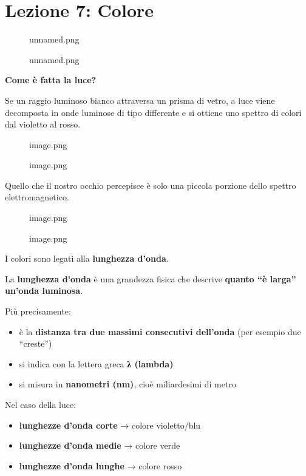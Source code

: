 \documentclass[
]{article}
\author{}
\date{}
\providecommand{\tightlist}{%
  \setlength{\itemsep}{0pt}\setlength{\parskip}{0pt}}
\begin{document}
\hypertarget{lezione-7-colore}{%
\section{Lezione 7: Colore}\label{lezione-7-colore}}

\begin{figure}
\centering
{unnamed.png}
\caption{unnamed.png}
\end{figure}

\textbf{Come è fatta la luce?}

Se un raggio luminoso bianco attraversa un prisma di vetro, a luce viene decomposta in onde luminose di tipo differente e si ottiene uno spettro di colori dal violetto al rosso.

\begin{figure}
\centering
{image.png}
\caption{image.png}
\end{figure}

Quello che il nostro occhio percepisce è solo una piccola porzione dello spettro elettromagnetico.

\begin{figure}
\centering
{image.png}
\caption{image.png}
\end{figure}

I colori sono legati alla \textbf{lunghezza d'onda}.

La \textbf{lunghezza d'onda} è una grandezza fisica che descrive \textbf{quanto ``è larga'' un'onda luminosa}.

Più precisamente:

\begin{itemize}
\tightlist
\item
  è la \textbf{distanza tra due massimi consecutivi dell'onda} (per esempio due ``creste'')
\item
  si indica con la lettera greca \textbf{λ (lambda)}
\item
  si misura in \textbf{nanometri (nm)}, cioè miliardesimi di metro
\end{itemize}

Nel caso della luce:

\begin{itemize}
\tightlist
\item
  \textbf{lunghezze d'onda corte} → colore violetto/blu
\item
  \textbf{lunghezze d'onda medie} → colore verde
\item
  \textbf{lunghezze d'onda lunghe} → colore rosso
\end{itemize}
\end{document}

